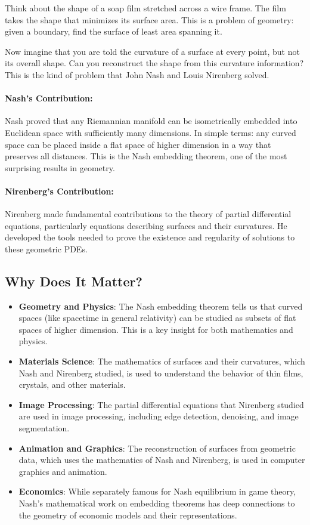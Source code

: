 Think about the shape of a soap film stretched across a wire frame. The film takes the shape that minimizes its surface area. This is a problem of geometry: given a boundary, find the surface of least area spanning it.

Now imagine that you are told the curvature of a surface at every point, but not its overall shape. Can you reconstruct the shape from this curvature information? This is the kind of problem that John Nash and Louis Nirenberg solved.

\paragraph{Nash's Contribution:} Nash proved that any Riemannian manifold can be isometrically embedded into Euclidean space with sufficiently many dimensions. In simple terms: any curved space can be placed inside a flat space of higher dimension in a way that preserves all distances. This is the Nash embedding theorem, one of the most surprising results in geometry.

\paragraph{Nirenberg's Contribution:} Nirenberg made fundamental contributions to the theory of partial differential equations, particularly equations describing surfaces and their curvatures. He developed the tools needed to prove the existence and regularity of solutions to these geometric PDEs.

\subsection{Why Does It Matter?}

\begin{itemize}
\item \textbf{Geometry and Physics}: The Nash embedding theorem tells us that curved spaces (like spacetime in general relativity) can be studied as subsets of flat spaces of higher dimension. This is a key insight for both mathematics and physics.

\item \textbf{Materials Science}: The mathematics of surfaces and their curvatures, which Nash and Nirenberg studied, is used to understand the behavior of thin films, crystals, and other materials.

\item \textbf{Image Processing}: The partial differential equations that Nirenberg studied are used in image processing, including edge detection, denoising, and image segmentation.

\item \textbf{Animation and Graphics}: The reconstruction of surfaces from geometric data, which uses the mathematics of Nash and Nirenberg, is used in computer graphics and animation.

\item \textbf{Economics}: While separately famous for Nash equilibrium in game theory, Nash's mathematical work on embedding theorems has deep connections to the geometry of economic models and their representations.
\end{itemize}

